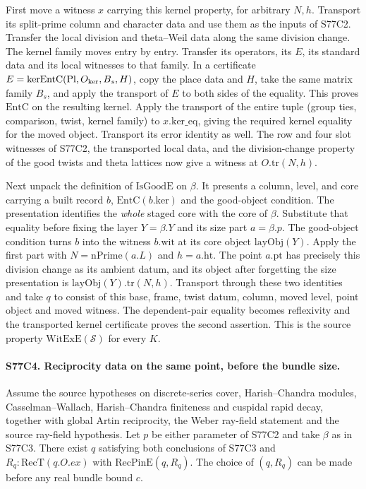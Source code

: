First move a witness $x$ carrying this kernel property, for arbitrary
$N,h$. Transport its split-prime column and character data and use
them as the inputs of S77C2. Transfer the local division and theta--Weil
data along the same division change. The kernel family moves entry
by entry. Transfer its operators, its $E$, its standard data and
its local witnesses to that family. In a certificate
$E=\mathrm{kerEntC}(\mathrm{Pl},O_{\rm ker},B_s,H)$, copy the
place data and $H$, take the same matrix family $B_s$, and apply
the transport of $E$ to both sides of the equality. This proves
$\mathrm{EntC}$ on the resulting kernel. Apply the transport of
the entire tuple (group ties, comparison, twist, kernel family) to
$x.\mathrm{ker\_eq}$, giving the required kernel equality for
the moved object. Transport its error identity as well. The row
and four slot witnesses of S77C2, the transported local data,
and the division-change property of the good twists and theta
lattices now give a witness at $O.\mathrm{tr}(N,h)$.

Next unpack the definition of $\mathrm{IsGoodE}$ on $\beta$.
It presents a column, level, and core carrying a built record $b$,
$\mathrm{EntC}(b.\mathrm{ker})$ and the good-object condition.
The presentation identifies the \emph{whole} staged core with the
core of $\beta$. Substitute that equality before fixing the layer
$Y=\beta.Y$ and its size part $a=\beta.p$. The good-object condition
turns $b$ into the witness $b.\mathrm{wit}$ at its core object
$\mathrm{layObj}(Y)$. Apply the first part with
$N=\mathrm{nPrime}(a.L)$ and $h=a.\mathrm{ht}$. The point
$a.\mathrm{pt}$ has precisely this division change as its ambient
datum, and its object after forgetting the size presentation is
$\mathrm{layObj}(Y).\mathrm{tr}(N,h)$. Transport through these
two identities and take $q$ to consist of this base, frame, twist
datum, column, moved level, point object and moved witness. The
dependent-pair equality becomes reflexivity and the transported
kernel certificate proves the second assertion. This is the
source property $\mathrm{WitExE}(\mathcal S)$ for every $K$.

\paragraph{S77C4. Reciprocity data on the same point, before the bundle size.}
Assume the source hypotheses on discrete-series cover,
Harish--Chandra modules, Casselman--Wallach, Harish--Chandra
finiteness and cuspidal rapid decay, together with global Artin
reciprocity, the Weber ray-field statement and the source ray-field
hypothesis. Let $p$ be either parameter of S77C2 and take $\beta$
as in S77C3. There exist $q$ satisfying both conclusions of S77C3
and $R_q:\mathrm{RecT}(q.O.ex)$ with $\mathrm{RecPinE}(q,R_q)$.
The choice of $(q,R_q)$ can be made before any real bundle bound $c$.

